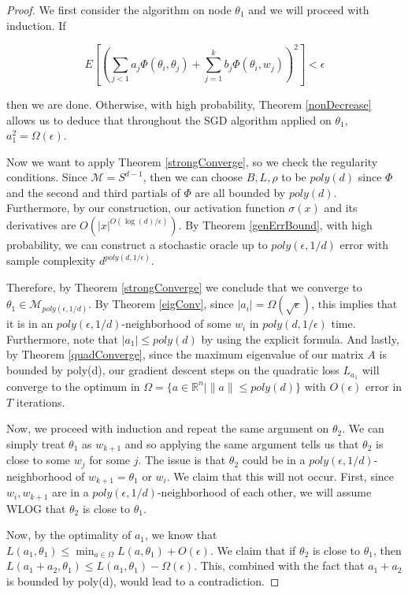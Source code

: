 \documentclass{article}
\newcommand{\R}{{\mathbb{R}}}
\begin{document}
\begin{proof}
We first consider the algorithm on node $\theta_1$ and we will proceed with induction. If

\[ E\left[\left( \sum_{j < 1} a_j \Phi(\theta_i,\theta_j) + \sum_{j=1}^k b_j \Phi(\theta_i,w_j)\right)^2\right] < \epsilon\]

then we are done. Otherwise, with high probability, Theorem \ref{nonDecrease} allows us to deduce that throughout the SGD algorithm applied on $\theta_1$, $a_1^2 = \Omega(\epsilon)$. 

Now we want to apply Theorem \ref{strongConverge}, so we check the regularity conditions. Since $\mathcal{M} = S^{d-1}$, then we can choose $B, L, \rho$ to be $poly(d)$ since $\Phi$ and the second and third partials of $\Phi$ are all bounded by $poly(d)$. Furthermore, by our construction, our activation function $\sigma(x)$ and its derivatives are $O(|x|^{O(\log(d)/\epsilon)})$. By Theorem \ref{genErrBound}, with high probability, we can construct a stochastic oracle up to $poly(\epsilon,1/d)$ error with sample complexity $d^{poly(d,1/\epsilon)}$.


Therefore, by Theorem \ref{strongConverge} we conclude that we converge to $\theta_1 \in \mathcal{M}_{poly(\epsilon,1/d)}$. By Theorem \ref{eigConv}, since $|a_i| = \Omega(\sqrt{\epsilon})$, this implies that it is in an $poly(\epsilon,1/d)$-neighborhood of some $w_{i}$ in $poly(d,1/\epsilon)$ time. Furthermore, note that $|a_1| \leq poly(d)$ by using the explicit formula. And lastly, by Theorem \ref{quadConverge}, since the maximum eigenvalue of our matrix $A$ is bounded by poly(d), our gradient descent steps on the quadratic loss $L_{a_1}$ will converge to the optimum in $\Omega = \{a \in \R^n | \|a\| \leq poly(d)\}$ with $O(\epsilon)$ error in $T$ iterations.

Now, we proceed with induction and repeat the same argument on $\theta_2$. We can simply treat $\theta_1$ as $w_{k+1}$ and so applying the same argument tells us that $\theta_2$ is close to some $w_j$ for some $j$. The issue is that $\theta_2$ could be in a $poly(\epsilon,1/d)$-neighborhood of $w_{k+1} = \theta_1$ or $w_i$. We claim that this will not occur. First, since $w_i, w_{k+1}$ are in a $poly(\epsilon,1/d)$-neighborhood of each other, we will assume WLOG that $\theta_2$ is close to $\theta_1$.

Now, by the optimality of $a_1$, we know that $L(a_1,\theta_1) \leq \min_{a \in \Omega} L(a,\theta_1) + O(\epsilon)$. We claim that if $\theta_2$ is close to $\theta_1$, then $L(a_1+a_2,\theta_1) \leq L(a_1,\theta_1) - \Omega(\epsilon)$. This, combined with the fact that $a_1 + a_2$ is bounded by poly(d), would lead to a contradiction.


\end{proof}
\end{document}
